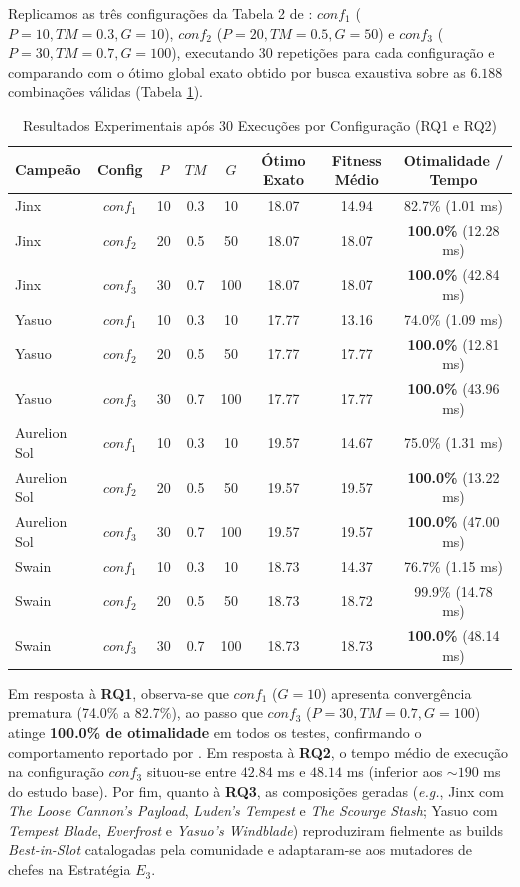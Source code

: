 \documentclass[12pt]{article}
\begin{document}
Replicamos as três configurações da Tabela 2 de \cite{balbinot2024}: $conf_1$ ($P=10, TM=0.3, G=10$), $conf_2$ ($P=20, TM=0.5, G=50$) e $conf_3$ ($P=30, TM=0.7, G=100$), executando 30 repetições para cada configuração e comparando com o ótimo global exato obtido por busca exaustiva sobre as $6.188$ combinações válidas (Tabela \ref{tab:results}).

\begin{table}[h]
\centering
\small
\caption{Resultados Experimentais após 30 Execuções por Configuração (RQ1 e RQ2)}
\label{tab:results}
\begin{tabular}{lccccccc}
\hline
\textbf{Campeão} & \textbf{Config} & $P$ & $TM$ & $G$ & \textbf{Ótimo Exato} & \textbf{Fitness Médio} & \textbf{Otimalidade / Tempo} \\
\hline
Jinx & $conf_1$ & 10 & 0.3 & 10 & 18.07 & 14.94 & 82.7\% (1.01 ms) \\
Jinx & $conf_2$ & 20 & 0.5 & 50 & 18.07 & 18.07 & \textbf{100.0\%} (12.28 ms) \\
Jinx & $conf_3$ & 30 & 0.7 & 100 & 18.07 & 18.07 & \textbf{100.0\%} (42.84 ms) \\
\hline
Yasuo & $conf_1$ & 10 & 0.3 & 10 & 17.77 & 13.16 & 74.0\% (1.09 ms) \\
Yasuo & $conf_2$ & 20 & 0.5 & 50 & 17.77 & 17.77 & \textbf{100.0\%} (12.81 ms) \\
Yasuo & $conf_3$ & 30 & 0.7 & 100 & 17.77 & 17.77 & \textbf{100.0\%} (43.96 ms) \\
\hline
Aurelion Sol & $conf_1$ & 10 & 0.3 & 10 & 19.57 & 14.67 & 75.0\% (1.31 ms) \\
Aurelion Sol & $conf_2$ & 20 & 0.5 & 50 & 19.57 & 19.57 & \textbf{100.0\%} (13.22 ms) \\
Aurelion Sol & $conf_3$ & 30 & 0.7 & 100 & 19.57 & 19.57 & \textbf{100.0\%} (47.00 ms) \\
\hline
Swain & $conf_1$ & 10 & 0.3 & 10 & 18.73 & 14.37 & 76.7\% (1.15 ms) \\
Swain & $conf_2$ & 20 & 0.5 & 50 & 18.73 & 18.72 & 99.9\% (14.78 ms) \\
Swain & $conf_3$ & 30 & 0.7 & 100 & 18.73 & 18.73 & \textbf{100.0\%} (48.14 ms) \\
\hline
\end{tabular}
\end{table}

Em resposta à \textbf{RQ1}, observa-se que $conf_1$ ($G=10$) apresenta convergência prematura (74.0\% a 82.7\%), ao passo que $conf_3$ ($P=30, TM=0.7, G=100$) atinge \textbf{100.0\% de otimalidade} em todos os testes, confirmando o comportamento reportado por \cite{balbinot2024}. Em resposta à \textbf{RQ2}, o tempo médio de execução na configuração $conf_3$ situou-se entre $42.84$ ms e $48.14$ ms (inferior aos $\sim 190$ ms do estudo base). Por fim, quanto à \textbf{RQ3}, as composições geradas (\textit{e.g.}, Jinx com \textit{The Loose Cannon's Payload}, \textit{Luden's Tempest} e \textit{The Scourge Stash}; Yasuo com \textit{Tempest Blade}, \textit{Everfrost} e \textit{Yasuo's Windblade}) reproduziram fielmente as builds \textit{Best-in-Slot} catalogadas pela comunidade e adaptaram-se aos mutadores de chefes na Estratégia $E_3$.
\end{document}
